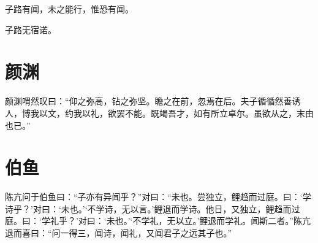 \documentclass[a5paper]{ctexbook}
\begin{document}
    子路有闻，未之能行，惟恐有闻。

    子路无宿诺。

    \chapter{颜渊}

    颜渊喟然叹曰：“仰之弥高，钻之弥坚。瞻之在前，忽焉在后。夫子循循然善诱人，博我以文，约我以礼，欲罢不能。既竭吾才，如有所立卓尔。虽欲从之，末由也已。”

    \chapter{伯鱼}

    陈亢问于伯鱼曰：“子亦有异闻乎？”对曰：“未也。尝独立，鲤趋而过庭。曰：‘学诗乎？’对曰：‘未也。’‘不学诗，无以言。’鲤退而学诗。他日，又独立，鲤趋而过庭。曰：‘学礼乎？’对曰：‘未也。’‘不学礼，无以立。’鲤退而学礼。闻斯二者。”陈亢退而喜曰：“问一得三，闻诗，闻礼，又闻君子之远其子也。”
\end{document}
